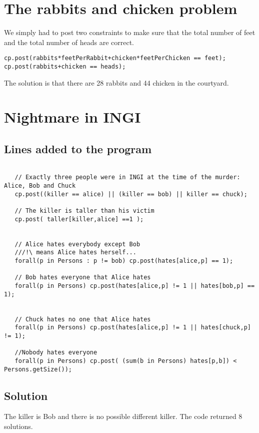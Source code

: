 \documentclass{eplDoc}
\begin{document}
\maketitle
\newpage

\section{The rabbits and chicken problem}

We simply had to post two constraints to make sure that the total number of feet and the total number of heads are correct. 
\lstset{breaklines=true, breakatwhitespace=false}
\begin{lstlisting}
cp.post(rabbits*feetPerRabbit+chicken*feetPerChicken == feet);
cp.post(rabbits+chicken == heads);
\end{lstlisting}

The solution is that there are 28 rabbits and 44 chicken in the courtyard. 


\section{Nightmare in INGI}
\subsection{Lines added to the program}
\begin{lstlisting}

   // Exactly three people were in INGI at the time of the murder: Alice, Bob and Chuck
   cp.post((killer == alice) || (killer == bob) || killer == chuck);

   // The killer is taller than his victim
   cp.post( taller[killer,alice] ==1 );

     
   // Alice hates everybody except Bob
   ///!\ means Alice hates herself...
   forall(p in Persons : p != bob) cp.post(hates[alice,p] == 1);

   // Bob hates everyone that Alice hates
   forall(p in Persons) cp.post(hates[alice,p] != 1 || hates[bob,p] == 1);
   

   // Chuck hates no one that Alice hates
   forall(p in Persons) cp.post(hates[alice,p] != 1 || hates[chuck,p] != 1);

   //Nobody hates everyone
   forall(p in Persons) cp.post( (sum(b in Persons) hates[p,b]) < Persons.getSize());
\end{lstlisting}
\subsection{Solution}
The killer is Bob and there is no possible different killer. The code returned 8 solutions.   
\end{document}
